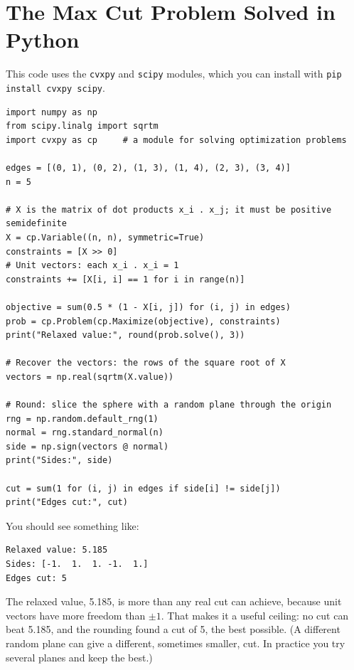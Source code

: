 \section{The Max Cut Problem Solved in Python}
This code uses the \texttt{cvxpy} and \texttt{scipy} modules, which you can install with \texttt{pip install cvxpy scipy}.
\begin{verbatim}
import numpy as np
from scipy.linalg import sqrtm
import cvxpy as cp     # a module for solving optimization problems

edges = [(0, 1), (0, 2), (1, 3), (1, 4), (2, 3), (3, 4)]
n = 5

# X is the matrix of dot products x_i . x_j; it must be positive semidefinite
X = cp.Variable((n, n), symmetric=True)
constraints = [X >> 0]
# Unit vectors: each x_i . x_i = 1
constraints += [X[i, i] == 1 for i in range(n)]

objective = sum(0.5 * (1 - X[i, j]) for (i, j) in edges)
prob = cp.Problem(cp.Maximize(objective), constraints)
print("Relaxed value:", round(prob.solve(), 3))

# Recover the vectors: the rows of the square root of X
vectors = np.real(sqrtm(X.value))

# Round: slice the sphere with a random plane through the origin
rng = np.random.default_rng(1)
normal = rng.standard_normal(n)
side = np.sign(vectors @ normal)
print("Sides:", side)

cut = sum(1 for (i, j) in edges if side[i] != side[j])
print("Edges cut:", cut)
\end{verbatim}

You should see something like:
\begin{verbatim}
Relaxed value: 5.185
Sides: [-1.  1.  1. -1.  1.]
Edges cut: 5
\end{verbatim}
The relaxed value, 5.185, is more than any real cut can achieve, because
unit vectors have more freedom than $\pm 1$. That makes it a useful
ceiling: no cut can beat 5.185, and the rounding found a cut of 5, the
best possible. (A different random plane can give a different, sometimes
smaller, cut. In practice you try several planes and keep the best.)
